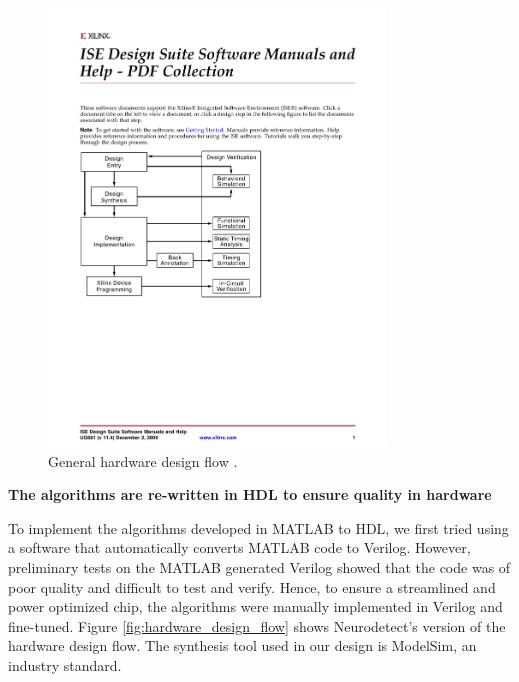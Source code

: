 \documentclass[usletter, 11pt]{extarticle}
\begin{document}
\begin{figure}[!h]
	\centering
	\includegraphics[width = 0.8\textwidth]{img/HardwareDiagram_overview}
	\caption{General hardware design flow \protect\cite{xilinx_manual}.}
	\label{fig:hardware_diagram}
\end{figure}

\vspace{11pt}
\textbf{The algorithms are re-written in HDL to ensure quality in hardware}

To implement the algorithms developed in MATLAB to HDL, we first tried using a software that automatically converts MATLAB code to Verilog. However, preliminary tests on the MATLAB generated Verilog showed that the code was of poor quality and difficult to  test and verify. Hence, to ensure a streamlined and power optimized chip, the algorithms were manually implemented in Verilog and fine-tuned. Figure \ref{fig:hardware_design_flow} shows Neurodetect’s version of the hardware design flow. The synthesis tool used in our design is ModelSim, an industry standard.
\end{document}
